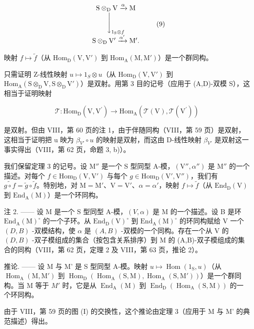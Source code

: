 \[
\begin{array}{c} \mathrm{S} \otimes_ {\mathrm{D}} \mathrm{V} \xrightarrow {\alpha} \mathrm{M} \\ \Biggl \downarrow_ {1 _ {\mathrm{S}} \otimes f} \\ \mathrm{S} \otimes_ {\mathrm{D}} \mathrm{V} ^ {\prime} \xrightarrow {\alpha^ {\prime}} \mathrm{M} ^ {\prime}. \end{array}\tag{9}
\]

映射 \(f \mapsto \widetilde{f}\)（从 \(\mathrm{Hom}_{\mathrm{D}}(\mathrm{V},\mathrm{V}')\) 到 \(\mathrm{Hom}_{\mathrm{A}}(\mathrm{M},\mathrm{M}')\)）是一个群同构。

只需证明 Z-线性映射 \(u \mapsto 1_{S} \otimes u\)（从 \(\mathrm{Hom}_{\mathrm{D}}(\mathrm{V}, \mathrm{V}')\) 到 \(\mathrm{Hom}_{\mathrm{A}}(\mathrm{S} \otimes_{\mathrm{D}} \mathrm{V}, \mathrm{S} \otimes_{\mathrm{D}} \mathrm{V}')\)）是双射。用第 3 目的记号（应用于 (A,D)-双模 S），这相当于证明映射

\[
\mathcal {T}: \mathrm{Hom} _ {\mathrm{D}} (\mathrm{V}, \mathrm{V} ^ {\prime}) \longrightarrow \mathrm{Hom} _ {\mathrm{A}} (\mathcal {T} (\mathrm{V}), \mathcal {T} (\mathrm{V} ^ {\prime}))
\]

是双射。但由 VIII，第 60 页的注 1，由于伴随同构（VIII，第 59 页）是双射，这相当于证明把 u 映为 \(\beta_{V'} \circ u\) 的映射是双射，而这由 D-线性映射 \(\beta_{V'}\) 是双射这一事实得出（VIII，第 62 页，命题 3, b)）。

我们保留定理 3 的记号。设 \(\mathrm{M}''\) 是一个 S 型同型 A-模，\((\mathrm{V}'',\alpha '')\) 是 \(\mathrm{M}''\) 的一个描述。对每个 \(f\in \mathrm{Hom}_{\mathrm{D}}(\mathrm{V},\mathrm{V}')\) 与每个 \(g\in \mathrm{Hom}_{\mathrm{D}}(\mathrm{V}',\mathrm{V}'')\)，我们有 \(\widetilde{g\circ f} = \widetilde{g}\circ \widetilde{f}\)。特别地，对 \(\mathrm{M} = \mathrm{M}'\)、\(\mathrm{V} = \mathrm{V}'\)、\(\alpha = \alpha '\)，映射 \(f\mapsto \widetilde{f}\)（从 \(\mathrm{End}_{\mathrm{D}}(\mathrm{V})\) 到 \(\mathrm{End}_{\mathrm{A}}(\mathrm{M})\)）是一个环同构。

注 2. —— 设 M 是一个 S 型同型 A-模，\((V,\alpha)\) 是 M 的一个描述。设 B 是环 \(\mathrm{End}_{\mathrm{A}}(\mathrm{M})^{\circ}\) 的一个子环。从 \(\mathrm{End}_{\mathrm{D}}(\mathrm{V})^{\circ}\) 到 \(\mathrm{End}_{\mathrm{A}}(\mathrm{M})^{\circ}\) 的环同构赋给 V 一个 \((D,B)\) -双模结构，使 \(\alpha\) 是 \((A,B)\) -双模的一个同构。存在一个从 V 的 \((D,B)\) -双子模组成的集合（按包含关系排序）到 M 的 (A,B)-双子模组成的集合的同构（VIII，第 62 页，定理 2 及 VIII，第 63 页，推论 2）。

推论. —— 设 M 与 M' 是 S 型同型 A-模。映射 \(u \mapsto \operatorname{Hom}(1_{\mathrm{S}}, u)\)（从 \(\operatorname{Hom}_{\mathrm{A}}(\mathrm{M}, \mathrm{M}')\) 到 \(\operatorname{Hom}_{\mathrm{D}}(\operatorname{Hom}_{\mathrm{A}}(\mathrm{S}, \mathrm{M}), \operatorname{Hom}_{\mathrm{A}}(\mathrm{S}, \mathrm{M}'))\)）是一个群同构。当 M 等于 \(M'\) 时，它是从 \(\operatorname{End}_{\mathrm{A}}(\mathrm{M})\) 到 \(\operatorname{End}_{\mathrm{D}}(\operatorname{Hom}_{\mathrm{A}}(\mathrm{S}, \mathrm{M}))\) 的一个环同构。

由于 VIII，第 59 页的图 (I) 的交换性，这个推论由定理 3（应用于 M 与 M' 的典范描述）得出。
\relax{}
